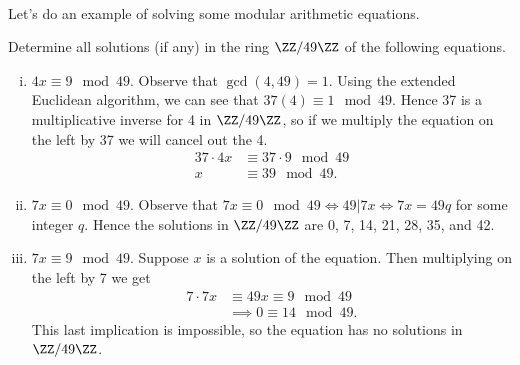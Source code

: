 \documentclass[../abstract_algebra.tex]{subfiles}
\begin{document}
        \paragraph{}
        Let's do an example of solving some modular arithmetic equations.
        \begin{example}
            Determine all solutions (if any) in the ring $\ZZ/49\ZZ$ of the following equations.
            \begin{enumerate}[(i)]
                \item $4x\equiv 9\mod 49$.
                Observe that $\gcd(4,49)=1$. Using the extended Euclidean algorithm, we can see that $37(4)\equiv 1\mod49$.
                Hence 37 is a multiplicative inverse for 4 in $\ZZ/49\ZZ$, so if we multiply the equation on the left by 37 we will cancel out the 4.
                \begin{align}
                    37\cdot 4x&\equiv 37\cdot 9\mod 49\\
                    x&\equiv 39\mod 49.
                \end{align}
                \item $7x\equiv 0\mod 49$.
                Observe that $7x\equiv 0\mod 49\iff 49|7x\iff 7x=49q$ for some integer $q$.
                Hence the solutions in $\ZZ/49\ZZ$ are 0, 7, 14, 21, 28, 35, and 42.
                \item $7x\equiv 9\mod 49$.
                Suppose $x$ is a solution of the equation.
                Then multiplying on the left by 7 we get
                \begin{align}
                    7\cdot 7x&\equiv 49x\equiv 9\mod 49\\
                    &\implies 0\equiv 14\mod 49.
                \end{align}
                This last implication is impossible, so the equation has no solutions in $\ZZ/49\ZZ$.
            \end{enumerate}
        \end{example}
\end{document}

